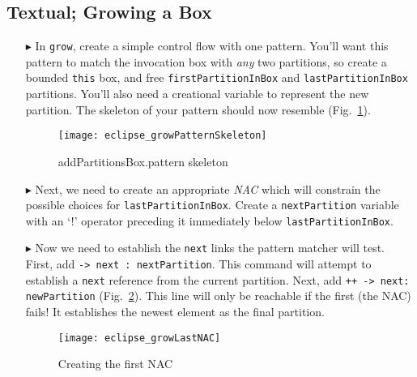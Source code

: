 \clearpage
\subsection{Textual; Growing a Box}
\texHeader
\hypertarget{growBox tex}{}

\vspace*{0.5cm}

\begin{itemize}

\item[$\blacktriangleright$] In \texttt{grow}, create a simple control flow with one pattern. You'll want this pattern to match the invocation box with
\emph{any} two partitions, so create a bounded \texttt{this} box, and free \texttt{firstPartitionInBox} and \texttt{lastPartitionInBox} partitions.
You'll also need a creational variable to represent the new partition. The skeleton of your pattern should now resemble (Fig.~\ref{fig:growPattSkel}).

\vspace{0.5cm}

\begin{figure}[htbp]
\begin{center}
  \texttt{[image: eclipse\_growPatternSkeleton]}
  \caption{addPartitionsBox.pattern skeleton}
  \label{fig:growPattSkel}
\end{center}
\end{figure}

\item[$\blacktriangleright$] Next, we need to create an appropriate \emph{NAC} which will constrain the possible choices for \texttt{lastPartitionInBox}.
Create a \texttt{nextPartition} variable with an `!' operator preceding it immediately below \texttt{lastPartitionInBox}.

\vspace{0.5cm}

\item[$\blacktriangleright$] Now we need to establish the \texttt{next} links the pattern matcher will test. First, add \texttt{-> next : nextPartition}. This
command will attempt to establish a \texttt{next} reference from the current partition. Next, add \texttt{++ -> next: newPartition} (Fig.~\ref{fig:firstNAC}).
This line will only be reachable if the first (the NAC) fails! It establishes the newest element as the final partition.

\begin{figure}[htbp]
\begin{center}
  \texttt{[image: eclipse\_growLastNAC]}
  \caption{Creating the first NAC}
  \label{fig:firstNAC}
\end{center}
\end{figure}


\end{itemize}
